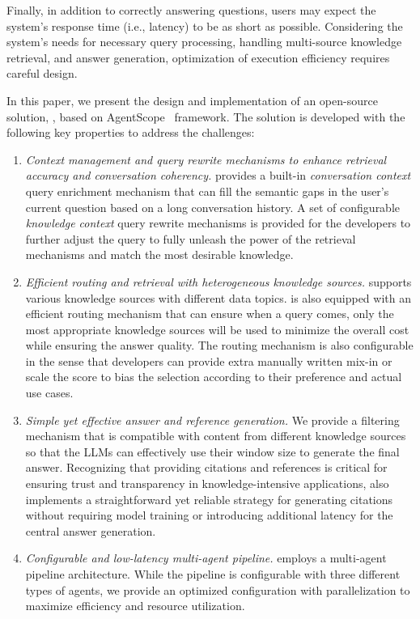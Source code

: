 Finally, in addition to correctly answering questions, users may expect the system's response time (i.e., latency) to be as short as possible.
Considering the system's needs for necessary query processing, handling multi-source knowledge retrieval, and answer generation, optimization of execution efficiency requires careful design.


In this paper, we present the design and implementation of an open-source solution, \ours, based on AgentScope~\cite{gao2024agentscope} framework. 
The solution is developed with the following key properties to address the challenges:
\begin{enumerate}
    \item 
    \emph{Context management and query rewrite mechanisms to enhance retrieval accuracy and conversation coherency.}
    \ours provides a built-in \emph{conversation context} query enrichment mechanism that can fill the semantic gaps in the user's current question based on a long conversation history.
    A set of configurable \emph{knowledge context} query rewrite mechanisms is provided for the developers to further adjust the query to fully unleash the power of the retrieval mechanisms and match the most desirable knowledge.       
    
    \item 
    \emph{Efficient routing and retrieval with heterogeneous knowledge sources.}
    \ours supports various knowledge sources with different data topics.
    \ours is also equipped with an efficient routing mechanism that can ensure when a query comes, only the most appropriate knowledge sources will be used to minimize the overall cost while ensuring the answer quality.
    The routing mechanism is also configurable in the sense that developers can provide extra manually written mix-in or scale the score to bias the selection according to their preference and actual use cases.

    \item 
    \emph{Simple yet effective answer and reference generation.}
    We provide a filtering mechanism that is compatible with content from different knowledge sources so that the LLMs can effectively use their window size to generate the final answer.
    Recognizing that providing citations and references is critical for ensuring trust and transparency in knowledge-intensive applications, \ours also implements a straightforward yet reliable strategy for generating citations without requiring model training or introducing additional latency for the central answer generation.

    \item 
    \emph{Configurable and low-latency multi-agent pipeline.}
    \ours employs a multi-agent pipeline architecture. 
    While the pipeline is configurable with three different types of agents, we provide an optimized configuration with parallelization to maximize efficiency and resource utilization.
\end{enumerate}

